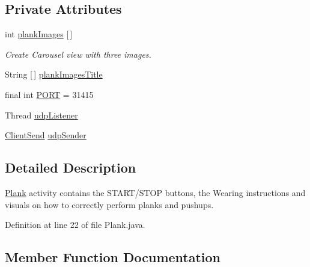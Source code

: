 \subsection*{Private Attributes}
\begin{DoxyCompactItemize}
\item 
int \mbox{\hyperlink{classcom_1_1example_1_1trainawearapplication_1_1_plank_af0574ebfbf8f016aebe193e5694c53fa}{plank\+Images}} \mbox{[}$\,$\mbox{]}
\begin{DoxyCompactList}\small\item\em Create Carousel view with three images. \end{DoxyCompactList}\item 
String \mbox{[}$\,$\mbox{]} \mbox{\hyperlink{classcom_1_1example_1_1trainawearapplication_1_1_plank_aaeb5339c942a37b01b333cd7cdeea57d}{plank\+Images\+Title}}
\item 
final int \mbox{\hyperlink{classcom_1_1example_1_1trainawearapplication_1_1_plank_afdb06528b46b1961c50dc081c3cf4557}{P\+O\+RT}} = 31415
\item 
Thread \mbox{\hyperlink{classcom_1_1example_1_1trainawearapplication_1_1_plank_ac43cc854533c5fc22b5638149d26512c}{udp\+Listener}}
\item 
\mbox{\hyperlink{classcom_1_1example_1_1trainawearapplication_1_1_client_send}{Client\+Send}} \mbox{\hyperlink{classcom_1_1example_1_1trainawearapplication_1_1_plank_a840985b7a4ec5f3092c91a8336e616e9}{udp\+Sender}}
\end{DoxyCompactItemize}


\subsection{Detailed Description}
\mbox{\hyperlink{classcom_1_1example_1_1trainawearapplication_1_1_plank}{Plank}} activity contains the S\+T\+A\+R\+T/\+S\+T\+OP buttons, the Wearing instructions and visuals on how to correctly perform planks and pushups. 

Definition at line 22 of file Plank.\+java.



\subsection{Member Function Documentation}
\mbox{\label{classcom_1_1example_1_1trainawearapplication_1_1_plank_a2220e1459dd56fb27948dcddf79bfcfa}} 
